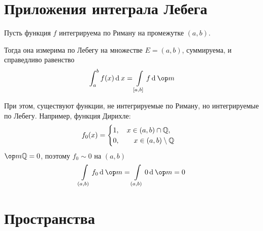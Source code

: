 \section{Приложения интеграла Лебега}

\begin{theorem}
	Пусть функция $ f $ интегрируема по Риману на промежутке $ (a, b) $.

	Тогда она измерима по Лебегу на множестве $ E = (a, b) $, суммируема, и справедливо равенство
	$$ \int_a^b f(x) \di x = \int\limits_{[a, b]} f \di \op m $$
\end{theorem}

\begin{noproof}
\end{noproof}

При этом, существуют функции, не интегрируемые по Риману, но интегрируемые по Лебегу. Например, функция Дирихле:
$$ f_0(x) =
\begin{cases}
	1, \quad x \in (a, b) \cap \mathbb{Q}, \\
	0, \qquad x \in (a, b) \setminus \mathbb{Q}
\end{cases} $$
$ \op m \Q = 0 $, поэтому $ f_0 \sim 0 $ на $ (a, b) $
$$ \int\limits_{(a, b)} f_0 \di \op m = \int\limits_{(a, b)} 0 \di \op m = 0 $$

\section{Пространства }
